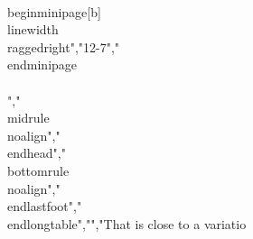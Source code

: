 {{{{{{{{{{ \\begin{minipage}[b]{\\linewidth}\\raggedright","12-7","\\end{minipage} \\\\","\\midrule\\noalign{}","\\endhead","\\bottomrule\\noalign{}","\\endlastfoot","\\end{longtable}","","That is close to a variatio}}}}}}}}}}
